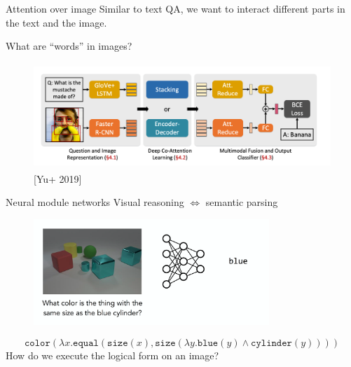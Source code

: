 \documentclass[usenames,dvipsnames,11pt,aspectratio=169]{beamer}
\begin{document}
\begin{frame}
    {Attention over image}
    Similar to text QA, we want to interact different parts in the text and the image.

    What are ``words'' in images?

    \begin{figure}
        \includegraphics[height=4cm]{figures/vqa-attention}
        \caption{[Yu+ 2019]}
    \end{figure}
\end{frame}

\begin{frame}
    {Neural module networks}
    Visual reasoning $\iff$ semantic parsing
    \begin{figure}
        \includegraphics[height=4cm]{figures/nmn-ex}
    \end{figure}
    $$
    \texttt{color}(
    \lambda x.\texttt{equal}(
    \texttt{size}(x),
    \texttt{size}(\lambda y.\texttt{blue}(y) \land \texttt{cylinder}(y))
    )
    )
    $$
    How do we execute the logical form on an image?
\end{frame}
\end{document}
